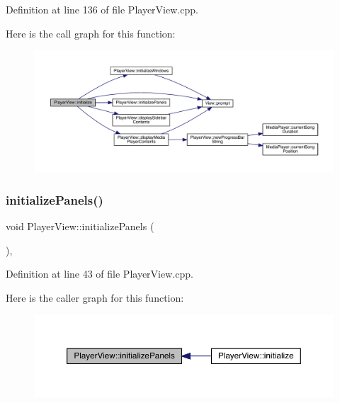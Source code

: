 Definition at line 136 of file Player\+View.\+cpp.

Here is the call graph for this function\+:
\nopagebreak
\begin{figure}[H]
\begin{center}
\leavevmode
\includegraphics[width=350pt]{class_player_view_a8f41109707205d01009aab96f72d338f_cgraph}
\end{center}
\end{figure}
\mbox{\label{class_player_view_a769ddbf3fcd1c8cce93cf34eed62db29}} 
\subsubsection{\texorpdfstring{initialize\+Panels()}{initializePanels()}}
{\footnotesize\ttfamily void Player\+View\+::initialize\+Panels (\begin{DoxyParamCaption}{ }\end{DoxyParamCaption})\hspace{0.3cm}{\ttfamily [inline]}, {\ttfamily [private]}}



Definition at line 43 of file Player\+View.\+cpp.

Here is the caller graph for this function\+:
\nopagebreak
\begin{figure}[H]
\begin{center}
\leavevmode
\includegraphics[width=350pt]{class_player_view_a769ddbf3fcd1c8cce93cf34eed62db29_icgraph}
\end{center}
\end{figure}
\mbox{\label{class_player_view_ae054992ef7cb944201aa643ca73327aa}} 
